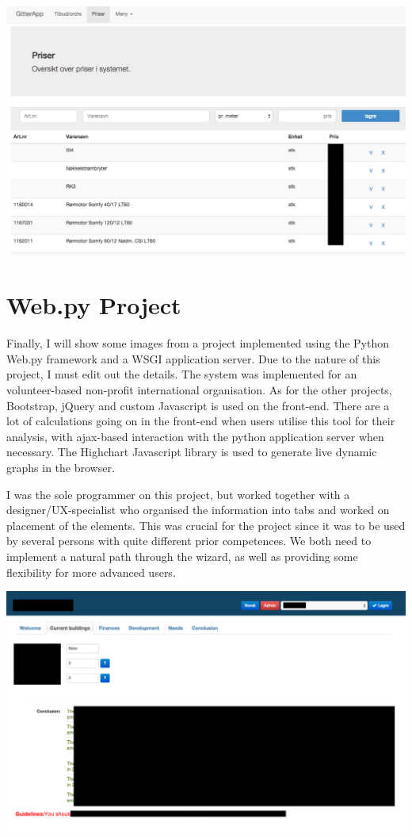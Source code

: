 \documentclass[11pt]{article}
\begin{document}
\vspace{2\baselineskip}
\noindent
\includegraphics[width=\textwidth]{portfolio-graphics/GA-3.png}    

\section*{Web.py Project}
Finally, I will show some images from a project implemented using the Python Web.py framework and a WSGI application server. Due to the nature of this project, I must edit out the details. The system was implemented for an volunteer-based non-profit international organisation. As for the other projects, Bootstrap, jQuery and custom Javascript is used on the front-end. There are a lot of calculations going on in the front-end when users utilise this tool for their analysis, with ajax-based interaction with the python application server when necessary. The Highchart Javascript library is used to generate live dynamic graphs in the browser. 

I was the sole programmer on this project, but worked together with a designer/UX-specialist who organised the information into tabs and worked on placement of the elements. This was crucial for the project since it was to be used by several persons with quite different prior competences. We both need to implement a natural path through the wizard, as well as providing some flexibility for more advanced users.

\vspace{2\baselineskip}
\noindent
\includegraphics[width=\textwidth]{portfolio-graphics/GH-1.png}    
\end{document}
